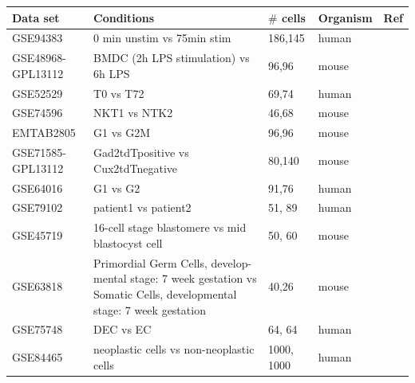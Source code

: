 \documentclass[aoas,preprint]{imsart}
\begin{document}
\begin{table}[b]
\tiny
\centering
\begin{tabular}{ |p{2cm}|p{5cm}|p{1.5cm}|p{1.5cm}|p{2cm}|}
\hline
 Data set & Conditions & $\#$ cells & Organism  & Ref \\ \hline \hline
GSE94383 & 0 min unstim vs 75min stim & 186,145 & human & \cite{Lane} \\ \hline
GSE48968-GPL13112 & BMDC (2h LPS stimulation) vs 6h LPS & 96,96 & mouse & \cite{Shalek} \\ \hline
GSE52529 & T0 vs T72 & 69,74 & human & \cite{Trapnell} \\ \hline
GSE74596 & NKT1 vs NTK2 & 46,68 & mouse & \cite{Engel} \\ \hline
EMTAB2805 & G1 vs G2M & 96,96 & mouse & \cite{EMTAB} \\ \hline
GSE71585-GPL13112 &Gad2tdTpositive vs Cux2tdTnegative  & 80,140 & mouse & \cite{Tasic} \\ \hline
GSE64016 & G1 vs G2 & 91,76 & human & \cite{oscope} \\ \hline
GSE79102 & patient1 vs patient2 & 51, 89 & human & \cite{sc3} \\ \hline
GSE45719 & 16-cell stage blastomere vs mid blastocyst cell & 50, 60 & mouse & \cite{Deng193} \\ \hline
GSE63818 & Primordial Germ Cells, develop- mental stage: 7 week gestation vs Somatic Cells, developmental stage: 7 week gestation & 40,26 & mouse & \cite{Guo} \\ \hline
GSE75748 & DEC vs EC & 64, 64 & human & \cite{chu} \\ \hline
GSE84465 & neoplastic cells vs non-neoplastic cells & 1000, 1000 & human & \cite{Darmanis} \\ \hline
\end{tabular}
\label{table:1}
\end{table}
\end{document}
